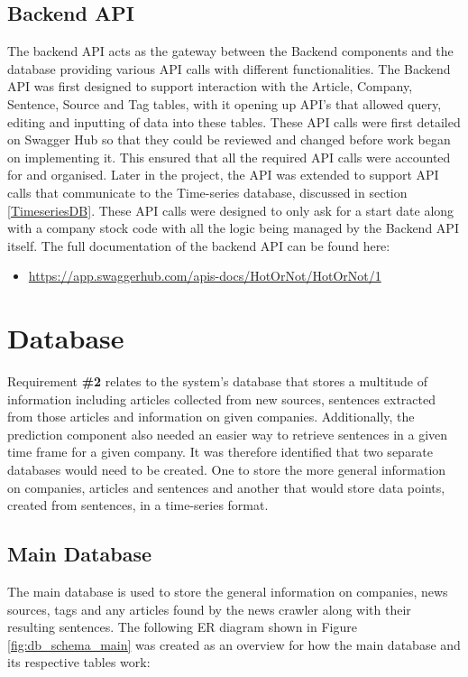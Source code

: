         
        \subsection{Backend API}
        \label{Backend API}
        The backend API acts as the gateway between the Backend components and the database providing various API calls with different functionalities. The Backend API was first designed to support interaction with the Article, Company, Sentence, Source and Tag tables, with it opening up API's that allowed query, editing and inputting of data into these tables. These API calls were first detailed on Swagger Hub \citep{website:Swagger} so that they could be reviewed and changed before work began on implementing it. This ensured that all the required API calls were accounted for and organised. Later in the project, the API was extended to support API calls that communicate to the Time-series database, discussed in section \ref{TimeseriesDB}. These API calls were designed to only ask for a start date along with a company stock code with all the logic being managed by the Backend API itself. The full documentation of the backend API can be found here:
        \begin{itemize}
            \item \url{https://app.swaggerhub.com/apis-docs/HotOrNot/HotOrNot/1}
        \end{itemize}
        
        
    \section{Database}
    \label{Datbase}    
    Requirement \textbf{\#2} relates to the system's database that stores a multitude of information including articles collected from new sources, sentences extracted from those articles and information on given companies. Additionally, the prediction component also needed an easier way to retrieve sentences in a given time frame for a given company. It was therefore identified that two separate databases would need to be created. One to store the more general information on companies, articles and sentences and another that would store data points, created from sentences, in a time-series format. 
    
        \subsection{Main Database}
        \label{Main Database}
        The main database is used to store the general information on companies, news sources, tags and any articles found by the news crawler along with their resulting sentences. The following ER diagram shown in Figure \ref{fig:db_schema_main} was created as an overview for how the main database and its respective tables work:
        
